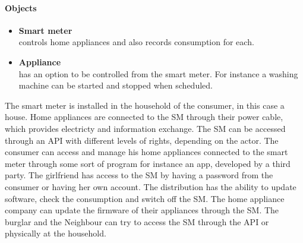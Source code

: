 \paragraph{Objects}
\begin{itemize}
\item \textbf{Smart meter}\\ controls home appliances and also records consumption for each.
\item \textbf{Appliance}\\ has an option to be controlled from the smart meter. For instance a washing machine can be started and stopped when scheduled.
\end{itemize}

The smart meter is installed in the household of the consumer, in this case a house.
Home appliances are connected to the SM through their power cable, which provides electricty and information exchange.
The SM can be accessed through an API with different levels of rights, depending on the actor.
The consumer can access and manage his home appliances connected to the smart meter through some sort of program for instance an app, developed by a third party.
The girlfriend has access to the SM by having a password from the consumer or having her own account.
The distribution has the ability to update software, check the consumption and switch off the SM.
The home appliance company can update the firmware of their appliances through the SM.
The burglar and the Neighbour can try to access the SM through the API or physically at the household.


